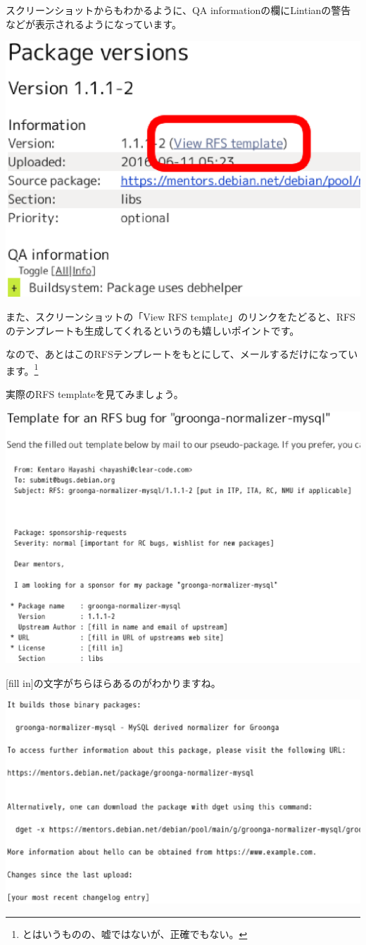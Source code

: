 \documentclass[mingoth,a4paper]{jsarticle}
\begin{document}
スクリーンショットからもわかるように、QA informationの欄にLintianの警告などが表示されるようになっています。

\begin{screen}
  \includegraphics[width=0.5\hsize]{image201606/view-rfs-template.eps}
\end{screen}

また、スクリーンショットの「View RFS template」のリンクをたどると、RFSのテンプレートも生成してくれるというのも嬉しいポイントです。

なので、あとはこのRFSテンプレートをもとにして、メールするだけになっています。\footnote{とはいうものの、嘘ではないが、正確でもない。}

実際のRFS templateを見てみましょう。

\begin{screen}
\includegraphics[width=0.5\hsize]{image201606/rfs-template-pithole.eps}
\end{screen}

[fill in]の文字がちらほらあるのがわかりますね。

\begin{screen}
\includegraphics[width=0.5\hsize]{image201606/rfs-template-pithole2.eps}
\end{screen}
\end{document}
